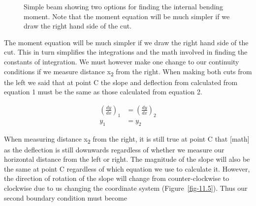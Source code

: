 \documentclass[
  letterpaper,
  DIV=11,
  numbers=noendperiod]{scrreprt}
\theoremstyle{definition}
\theoremstyle{remark}
\begin{document}
\begin{figure}


\caption{\label{fig-11.4}Simple beam showing two options for finding the
internal bending moment. Note that the moment equation will be much
simpler if we draw the right hand side of the cut.}

\end{figure}%

The moment equation will be much simpler if we draw the right hand side
of the cut. This in turn simplifies the integrations and the math
involved in finding the constants of integration. We must however make
one change to our continuity conditions if we measure distance
x\textsubscript{2} from the right. When making both cuts from the left
we said that at point C the slope and deflection from calculated from
equation 1 must be the same as those calculated from equation 2.

\[
\begin{aligned}
\left(\frac{d y}{d x}\right)_{1} & =\left(\frac{d y}{d x}\right)_{2} \\
y_{1} & =y_{2}
\end{aligned}
\]

When measuring distance x\textsubscript{2} from the right, it is still
true at point C that {[}math{]} as the deflection is still downwards
regardless of whether we measure our horizontal distance from the left
or right. The magnitude of the slope will also be the same at point C
regardless of which equation we use to calculate it. However, the
direction of rotation of the slope will change from counter-clockwise to
clockwise due to us changing the coordinate system
(Figure~\ref{fig-11.5}). Thus our second boundary condition must become
\end{document}
